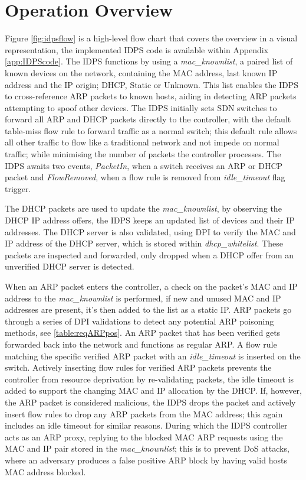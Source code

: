 \documentclass[12pt, oneside]{book}
\begin{document}
\section{Operation Overview}

Figure \ref{fig:idpsflow} is a high-level flow chart that covers the overview in a visual representation,
the implemented IDPS code is available within Appendix \ref{app:IDPScode}.
The IDPS functions by using a \emph{mac\_knownlist}, a paired list of known devices on the network,
containing the MAC address, last known IP address and the IP origin; DHCP, Static or Unknown.
This list enables the IDPS to cross-reference ARP packets to known hosts, 
aiding in detecting ARP packets attempting to spoof other devices.
The IDPS initially sets SDN switches to forward all ARP and DHCP packets directly to the controller,
with the default table-miss flow rule to forward traffic as a normal switch; this default rule allows all other
traffic to flow like a traditional network and not impede on normal traffic; while minimising
the number of packets the controller processes. The IDPS awaits two events, \emph{PacketIn},
when a switch receives an ARP or DHCP packet and \emph{FlowRemoved}, when a flow rule is removed from \emph{idle\_timeout}
flag trigger. 

The DHCP packets are used to update the \emph{mac\_knownlist}, by observing
the DHCP IP address offers, the IDPS keeps an updated list of devices and their IP addresses. The DHCP server is also validated,
using DPI to verify the MAC and IP address of the DHCP server, which is stored within \emph{dhcp\_whitelist}.
These packets are inspected and forwarded, only dropped when a DHCP offer from an unverified DHCP server is detected.

When an ARP packet enters the controller, a check on the packet's MAC and IP address to
the \emph{mac\_knownlist} is performed, if new and unused MAC and IP addresses are present, it's then added to the list as a static IP.
ARP packets go through a series of DPI validations to detect any potential ARP poisoning methods, see \ref{table:reqARPpos}.
An ARP packet that has been verified
gets forwarded back into the network and functions as regular ARP. A flow rule matching the specific verified ARP packet with an 
\emph{idle\_timeout} is inserted on the switch. Actively inserting flow rules for verified ARP packets prevents the controller from
resource deprivation by re-validating packets,
the idle timeout is added to support the changing MAC and IP allocation by the DHCP. If, however, the ARP packet is 
considered malicious, the IDPS drops the packet and actively insert flow rules to drop any ARP packets from the
MAC address; this again includes an idle timeout for similar reasons. During which the IDPS controller acts as an ARP proxy,
replying to the blocked MAC ARP requests using the MAC and IP pair stored in the \emph{mac\_knownlist}; this is to prevent DoS attacks,
where an adversary produces a false positive ARP block by having valid hosts MAC address blocked.
\end{document}
